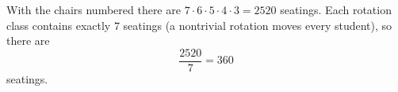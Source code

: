 With the chairs numbered there are $7\cdot6\cdot5\cdot4\cdot3=2520$ seatings. Each rotation class contains exactly $7$ seatings (a nontrivial rotation moves every student), so there are
\[
\dfrac{2520}{7}=\boxed{360}
\]
seatings.
